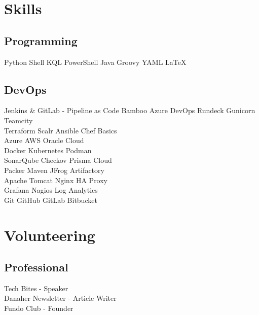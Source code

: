 \documentclass[a4paper]{deedy-resume-openfont}
\begin{document}
\begin{minipage}[t]{0.33\textwidth}

\section{Skills}
\subsection{Programming}
Python \textbullet{}  Shell \textbullet{} KQL \textbullet{} PowerShell 
 \textbullet{} Java \textbullet{} Groovy \textbullet{} YAML \textbullet{} \LaTeX \\ 
 \sectionsep
\subsection{DevOps}
Jenkins \& GitLab - Pipeline as Code \textbullet{} Bamboo \textbullet{} Azure DevOps \textbullet{} Rundeck \textbullet{} Gunicorn \textbullet{} Teamcity \\
Terraform \textbullet{} Scalr \textbullet{} Ansible \textbullet{} Chef Basics \\
Azure \textbullet{} AWS \textbullet{} Oracle Cloud \\
Docker \textbullet{} Kubernetes \textbullet{} Podman \\
SonarQube \textbullet{} Checkov \textbullet{} Prisma Cloud \\
Packer \textbullet{} Maven \textbullet{} JFrog Artifactory \\
Apache Tomcat \textbullet{} Nginx \textbullet{} HA Proxy \\
Grafana \textbullet{} Nagios \textbullet{} Log Analytics \\
Git \textbullet{} GitHub \textbullet{} GitLab \textbullet{} Bitbucket \\


\section{Volunteering}
\subsection{Professional}
Tech Bites - Speaker \\
Danaher Newsletter - Article Writer \\
Fundo Club - Founder \\
\sectionsep


\end{minipage}
\end{document}
